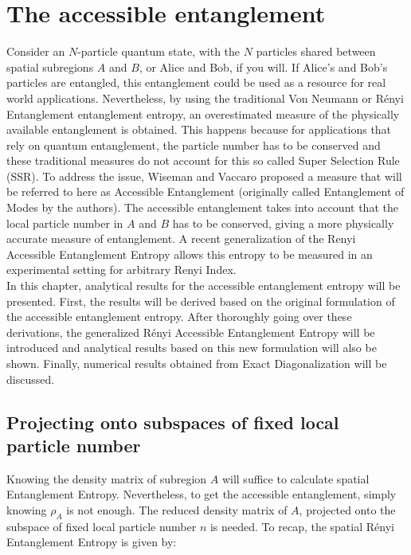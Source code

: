 \section{The accessible entanglement}

Consider an $N$-particle quantum state, with the $N$ particles shared between spatial subregions $A$ and $B$, or Alice and Bob, if you will. If Alice's and Bob's particles are entangled, this entanglement could be used as a resource for real world applications. Nevertheless, by using the traditional Von Neumann or R\'enyi Entanglement entanglement entropy, an overestimated measure of the physically available entanglement is obtained. This happens because for applications that rely on quantum entanglement, the particle number has to be conserved and these traditional measures do not account for this so called Super Selection Rule (SSR). To address the issue, Wiseman and Vaccaro \cite{PhysRevLett.91.097902} proposed a measure that will be referred to here as Accessible Entanglement (originally called Entanglement of Modes by the authors). The accessible entanglement takes into account that the local particle number in $A$ and $B$ has to be conserved, giving a more physically accurate measure of entanglement. A recent generalization of the Renyi Accessible Entanglement Entropy \cite{PhysRevLett.121.150501} allows this entropy to be measured in an experimental setting for arbitrary Renyi Index.\\

In this chapter, analytical results for the accessible entanglement entropy will be presented. 
First, the results will be derived based on the original formulation of the accessible entanglement entropy. After thoroughly going over these derivations, the generalized R\'enyi Accessible Entanglement Entropy will be introduced and analytical results based on this new formulation will also be shown. Finally, numerical results obtained from Exact Diagonalization will be discussed.

	\subsection{Projecting onto subspaces of fixed local particle number}
	
	Knowing the density matrix of subregion $A$ will suffice to calculate spatial Entanglement Entropy. Nevertheless, to get the accessible entanglement, simply knowing $\rho_{A}$ is not enough. The reduced density matrix of $A$, projected onto the subspace of fixed local particle number $n$ is needed. To recap, the spatial R\'enyi Entanglement Entropy is given by:
	
